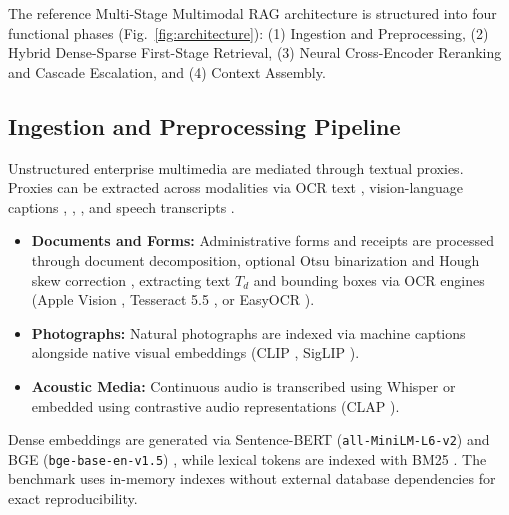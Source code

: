 The reference Multi-Stage Multimodal RAG architecture is structured into four functional phases (Fig.~\ref{fig:architecture}): (1) Ingestion and Preprocessing, (2) Hybrid Dense-Sparse First-Stage Retrieval, (3) Neural Cross-Encoder Reranking and Cascade Escalation, and (4) Context Assembly.

\subsection{Ingestion and Preprocessing Pipeline}
Unstructured enterprise multimedia are mediated through textual proxies. Proxies can be extracted across modalities via OCR text \cite{smith2007tesseract}, vision-language captions \cite{li2022blip}, \cite{li2023blip2}, \cite{xiao2024florence2}, and speech transcripts \cite{radford2023whisper}.
\begin{itemize}
    \setlength{\itemsep}{0.2pt plus 0.1pt}
    \setlength{\parskip}{0pt}
    \item \textbf{Documents and Forms:} Administrative forms and receipts are processed through document decomposition, optional Otsu binarization \cite{otsu1979} and Hough skew correction \cite{hough1962}, extracting text $T_d$ and bounding boxes via OCR engines (Apple Vision \cite{apple2020vision}, Tesseract 5.5 \cite{smith2007tesseract}, or EasyOCR \cite{jaidedai2020easyocr}).
    \item \textbf{Photographs:} Natural photographs are indexed via machine captions alongside native visual embeddings (CLIP \cite{radford2021clip}, SigLIP \cite{zhai2023siglip}).
    \item \textbf{Acoustic Media:} Continuous audio is transcribed using Whisper \cite{radford2023whisper} or embedded using contrastive audio representations (CLAP \cite{wu2023clap}).
\end{itemize}

Dense embeddings are generated via Sentence-BERT (\texttt{all-MiniLM-L6-v2}) \cite{reimers2019sbert} and BGE (\texttt{bge-base-en-v1.5}) \cite{xiao2023bge}, while lexical tokens are indexed with BM25 \cite{robertson2009bm25, robertson1995okapi}. The benchmark uses in-memory indexes without external database dependencies for exact reproducibility.

